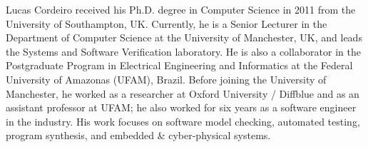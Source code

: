 \documentclass[journal]{IEEEtran}
\begin{document}
\begin{IEEEbiography}
    {Lucas Cordeiro}
received his Ph.D. degree in Computer Science in 2011 from the University of Southampton, UK. Currently, he is a Senior Lecturer in the Department of Computer Science at the University of Manchester, UK, and leads the Systems and Software Verification laboratory. He is also a collaborator in the Postgraduate Program in Electrical Engineering and Informatics at the Federal University of Amazonas (UFAM), Brazil. Before joining the University of Manchester, he worked as a researcher at Oxford University / Diffblue and as an assistant professor at UFAM; he also worked for six years as a software engineer in the industry. His work focuses on software model checking, automated testing, program synthesis, and embedded \& cyber-physical systems.
\end{IEEEbiography}





\end{document}
